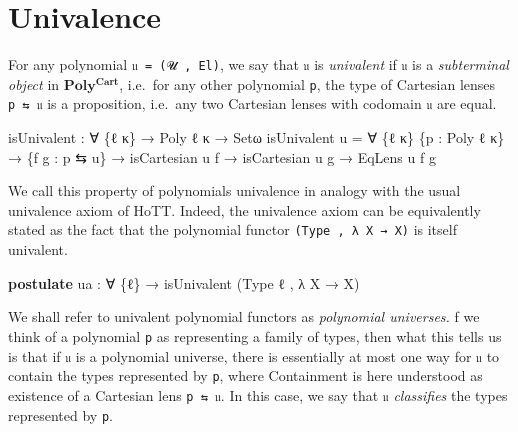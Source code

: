 \documentclass[
  11pt,
  oneside,
  article]{memoir}
\newenvironment{Shaded}{}{}
\newcommand{\KeywordTok}[1]{\textcolor[rgb]{0.00,0.44,0.13}{\textbf{#1}}}
\newcommand{\NormalTok}[1]{#1}
\newcommand{\OtherTok}[1]{\textcolor[rgb]{0.00,0.44,0.13}{#1}}
\theoremstyle{definition}
\theoremstyle{plain}
\newcommand{\0}{\textsf{0}}
\newcommand{\1}{\tn{\textsf{1}}}
\begin{document}
\section{Univalence}\label{univalence}

For any polynomial \texttt{𝔲\ =\ (𝓤\ ,\ El)}, we say that \texttt{𝔲} is
\emph{univalent} if \texttt{𝔲} is a \emph{subterminal object} in
\(\mathbf{Poly^{Cart}}\), i.e.~for any other polynomial \texttt{p}, the
type of Cartesian lenses \texttt{p\ ⇆\ 𝔲} is a proposition, i.e.~any two
Cartesian lenses with codomain \texttt{𝔲} are equal.

\begin{Shaded}
\begin{Highlighting}[]
\NormalTok{isUnivalent }\OtherTok{:} \OtherTok{∀} \OtherTok{\{}\NormalTok{ℓ κ}\OtherTok{\}} \OtherTok{→}\NormalTok{ Poly ℓ κ }\OtherTok{→}\NormalTok{ Setω}
\NormalTok{isUnivalent u }\OtherTok{=} 
    \OtherTok{∀} \OtherTok{\{}\NormalTok{ℓ\textquotesingle{} κ\textquotesingle{}}\OtherTok{\}} \OtherTok{\{}\NormalTok{p }\OtherTok{:}\NormalTok{ Poly ℓ\textquotesingle{} κ\textquotesingle{}}\OtherTok{\}}
      \OtherTok{→} \OtherTok{\{}\NormalTok{f g }\OtherTok{:}\NormalTok{ p ⇆ u}\OtherTok{\}}
      \OtherTok{→}\NormalTok{ isCartesian u f}
      \OtherTok{→}\NormalTok{ isCartesian u g}
      \OtherTok{→}\NormalTok{ EqLens u f g}
    
\end{Highlighting}
\end{Shaded}

We call this property of polynomials univalence in analogy with the
usual univalence axiom of HoTT. Indeed, the univalence axiom can be
equivalently stated as the fact that the polynomial functor
\texttt{(Type\ ,\ λ\ X\ →\ X)} is itself univalent.

\begin{Shaded}
\begin{Highlighting}[]
\KeywordTok{postulate}
\NormalTok{    ua }\OtherTok{:} \OtherTok{∀} \OtherTok{\{}\NormalTok{ℓ}\OtherTok{\}} \OtherTok{→}\NormalTok{ isUnivalent }\OtherTok{(}\NormalTok{Type ℓ , }\OtherTok{λ}\NormalTok{ X }\OtherTok{→}\NormalTok{ X}\OtherTok{)}
\end{Highlighting}
\end{Shaded}

We shall refer to univalent polynomial functors as \emph{polynomial
universes.} f we think of a polynomial \texttt{p} as representing a
family of types, then what this tells us is that if \texttt{𝔲} is a
polynomial universe, there is essentially at most one way for \texttt{𝔲}
to contain the types represented by \texttt{p}, where Containment is
here understood as existence of a Cartesian lens \texttt{p\ ⇆\ 𝔲}. In
this case, we say that \texttt{𝔲} \emph{classifies} the types
represented by \texttt{p}.
\end{document}
